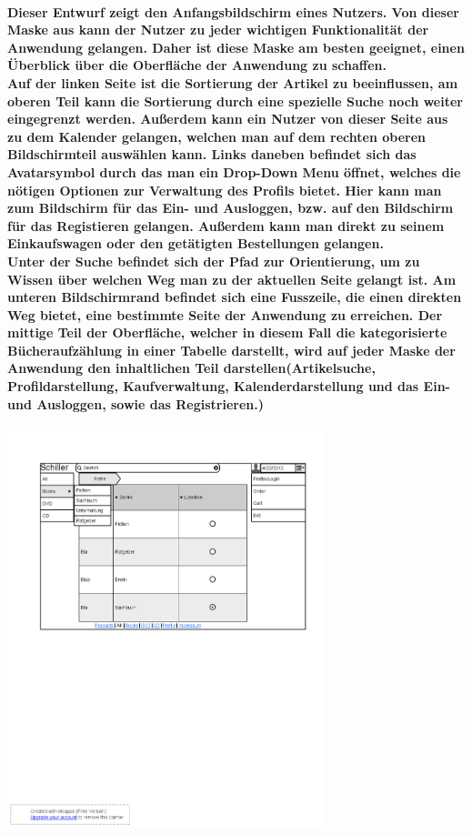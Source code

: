 \documentclass[a4paper]{article}
\begin{document}
\paragraph{Dieser Entwurf zeigt den Anfangsbildschirm eines Nutzers. Von dieser Maske aus kann der Nutzer zu jeder wichtigen Funktionalität der Anwendung gelangen. Daher ist diese Maske am besten geeignet, einen Überblick über die Oberfläche der Anwendung zu schaffen.\\
Auf der linken Seite ist die Sortierung der Artikel zu beeinflussen, am oberen Teil kann die Sortierung durch eine spezielle Suche noch weiter eingegrenzt werden. Außerdem kann ein Nutzer von dieser Seite aus zu dem Kalender gelangen, welchen man auf dem rechten oberen Bildschirmteil auswählen kann. Links daneben befindet sich das Avatarsymbol durch das man ein Drop-Down Menu öffnet, welches die nötigen Optionen zur Verwaltung des Profils bietet. Hier kann man zum Bildschirm für das Ein- und Ausloggen, bzw. auf den Bildschirm für das Registieren gelangen. Außerdem kann man direkt zu seinem Einkaufswagen oder den getätigten Bestellungen gelangen. \\
Unter der Suche befindet sich der Pfad zur Orientierung, um zu Wissen über welchen Weg man zu der aktuellen Seite gelangt ist.
Am unteren Bildschirmrand befindet sich eine Fusszeile, die einen direkten Weg bietet, eine bestimmte Seite der Anwendung zu erreichen.
Der mittige Teil der Oberfläche, welcher in diesem Fall die kategorisierte Bücheraufzählung in einer Tabelle darstellt, wird auf jeder Maske der Anwendung den inhaltlichen Teil darstellen(Artikelsuche, Profildarstellung, Kaufverwaltung, Kalenderdarstellung und das Ein- und Ausloggen, sowie das Registrieren.)\\}
\includegraphics[width=350px]{1Home_Costumer.png}
\end{document}
